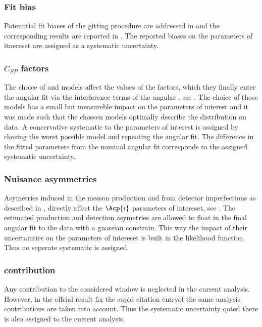 \subsubsection{Fit bias}
\label{systFitBias}
Potenntial fit biases of the gitting procedure are addressed in  and the corresponding 
results are reported in . The reported biases on the parameters of itnereset are assigned as a systematic uncertainty.

\subsubsection{$C_{SP}$ factors}
\label{systCSP}
The choice of \swave and \pwave models affect the values of the \CSP factors, which they finally enter the angular fit via the \spwave 
interference terms of the angular \pdf, see . The choice of those models has a small but measureble impact on the parameters of interest and it was made
such that the chossen models optimally describe the \mkpi distribution on data. A concervative systematic to the parameters of interest
is assigned by chosing the worst possible model and repeating the angular fit. The difference in the fitted parameters from the nominal
angular fit corresponds to the assigned systematic uncertainty.

\subsubsection{Nuisance \CP asymmetries}
\label{systDetProdAsymm}
Asymetries induced in the \Bs messon production and from detector imperfections as described in ,
directly affect the $\Acp{i}$ parameters of intereset, see . The estimated production
and detection asymetries are allowed to float in the final angular fit to the data with a guassian constrain. This way the impact 
of their uncertainties on the parameters of intereset is built in the likelihood function. Thus no seperate systematic is assigned.

\subsubsection{\dwave contribution}
\label{systCSP}
Any \dwave contribution to the considered \mkpi window is neglected in the current analysis.
However, in the offcial \lhcb result\cite{} {\color{red}fix the supid citation entry}of the same analysis \dwave contributions are taken into account.
Thus the systematic uncertainty qoted there is also assigned to the current analysis. 

